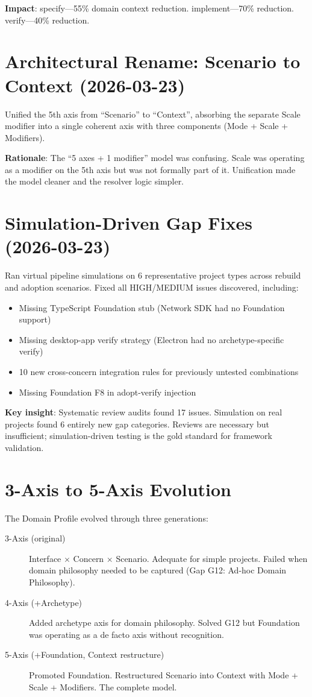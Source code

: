 \documentclass[11pt,a4paper,openright,twoside]{report}
\begin{document}
\textbf{Impact}: specify---55\% domain context reduction. implement---70\% reduction. verify---40\% reduction.

\section{Architectural Rename: Scenario to Context (2026-03-23)}

Unified the 5th axis from ``Scenario'' to ``Context'', absorbing the separate Scale modifier into a single coherent axis with three components (Mode + Scale + Modifiers).

\textbf{Rationale}: The ``5 axes + 1 modifier'' model was confusing. Scale was operating as a modifier on the 5th axis but was not formally part of it. Unification made the model cleaner and the resolver logic simpler.

\section{Simulation-Driven Gap Fixes (2026-03-23)}

Ran virtual pipeline simulations on 6 representative project types across rebuild and adoption scenarios. Fixed all HIGH/MEDIUM issues discovered, including:

\begin{itemize}
  \item Missing TypeScript Foundation stub (Network SDK had no Foundation support)
  \item Missing desktop-app verify strategy (Electron had no archetype-specific verify)
  \item 10 new cross-concern integration rules for previously untested combinations
  \item Missing Foundation F8 in adopt-verify injection
\end{itemize}

\textbf{Key insight}: Systematic review audits found 17 issues. Simulation on real projects found 6 entirely new gap categories. Reviews are necessary but insufficient; simulation-driven testing is the gold standard for framework validation.

\section{3-Axis to 5-Axis Evolution}

The Domain Profile evolved through three generations:

\begin{description}
  \item[3-Axis (original)] Interface $\times$ Concern $\times$ Scenario. Adequate for simple projects. Failed when domain philosophy needed to be captured (Gap G12: Ad-hoc Domain Philosophy).
  \item[4-Axis (+Archetype)] Added archetype axis for domain philosophy. Solved G12 but Foundation was operating as a de facto axis without recognition.
  \item[5-Axis (+Foundation, Context restructure)] Promoted Foundation. Restructured Scenario into Context with Mode + Scale + Modifiers. The complete model.
\end{description}
\end{document}
